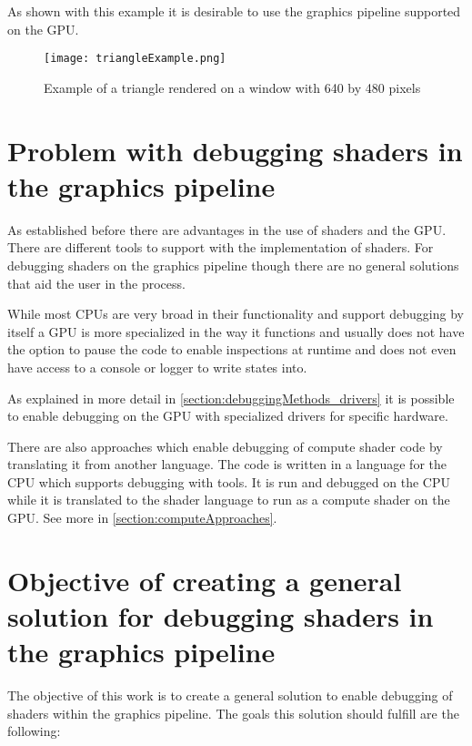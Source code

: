 As shown with this example it is desirable to use the graphics pipeline supported on the GPU.

\begin{figure}[h!]
  \centering 
  \texttt{[image: triangleExample.png]}
  \caption[Screenshot of triangle test render]{Example of a triangle rendered on a window with 640 by 480 pixels}
  \label{fig:triangleSample}
\end{figure}

\section{Problem with debugging shaders in the graphics pipeline}
\label{section:problems}

As established before there are advantages in the use of shaders and the GPU. There are different tools to support with the implementation of shaders. For debugging shaders on the graphics pipeline though there are no general solutions that aid the user in the process.

While most CPUs are very broad in their functionality and support debugging by itself a GPU is more specialized in the way it functions and usually does not have the option to pause the code to enable inspections at runtime and does not even have access to a console or logger to write states into.

As explained in more detail in \autoref{section:debuggingMethods_drivers} it is possible to enable debugging on the GPU with specialized drivers for specific hardware.

There are also approaches which enable debugging of compute shader code by translating it from another language. The code is written in a language for the CPU which supports debugging with tools. It is run and debugged on the CPU while it is translated to the shader language to run as a compute shader on the GPU.
See more in \autoref{section:computeApproaches}.

\section{Objective of creating a general solution for debugging shaders in the graphics pipeline}
\label{paragraph:objective}

The objective of this work is to create a general solution to enable debugging of shaders within the graphics pipeline. The goals this solution should fulfill are the following:

